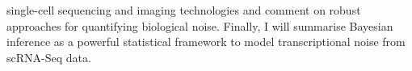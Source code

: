 \begin{Abstract}
single-cell sequencing and imaging technologies and comment on robust approaches for quantifying biological noise. Finally, I will summarise Bayesian inference as a powerful statistical framework to model transcriptional noise from \gls{scRNA-Seq} data.
\end{Abstract}

\newpage


\newpage

\newpage

\newpage

\newpage

\newpage

